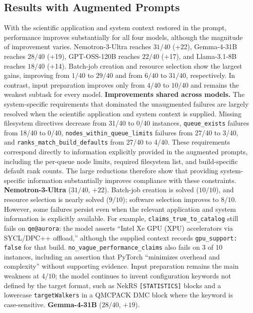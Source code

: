 \documentclass[conference]{IEEEtran}
\begin{document}
\subsection{Results with Augmented Prompts}
With the scientific application and system context restored in the prompt, performance improves substantially for all four models, although the magnitude of improvement varies. Nemotron-3-Ultra reaches $31/40$ (+22), Gemma-4-31B reaches $28/40$ (+19), GPT-OSS-120B reaches $22/40$ (+17), and Llama-3.1-8B reaches $18/40$ (+14). Batch-job creation and resource selection show the largest gains, improving from $1/40$ to $29/40$ and from $6/40$ to $31/40$, respectively. In contrast, input preparation improves only from $4/40$ to $10/40$ and remains the weakest subtask for every model.
\textbf{Improvements shared across models.}
The system-specific requirements that dominated the unaugmented failures are largely resolved when the scientific application and system context is supplied. Missing filesystem directives decrease from 31/40 to 0/40 instances, \texttt{queue\_exists} failures from 18/40 to 0/40, \texttt{nodes\_within\_queue\_limits} failures from 27/40 to 3/40, and \texttt{ranks\_match\_build\_defaults} from 27/40 to 4/40. These requirements correspond directly to information explicitly provided in the augmented prompts, including the per-queue node limits, required filesystem list, and build-specific default rank counts. The large reductions therefore show that providing system-specific information substantially improves compliance with these constraints.
\textbf{Nemotron-3-Ultra} ($31/40$, $+22$).
Batch-job creation is solved ($10/10$), and resource selection is nearly solved ($9/10$); software selection improves to $8/10$. However, some failures persist even when the relevant application and system information is explicitly available. For example, \texttt{claims\_true\_to\_catalog} still fails on \texttt{qe@aurora}: the model asserts ``Intel Xe GPU (XPU) accelerators via SYCL/DPC++ offload,'' although the supplied context records \texttt{gpu\_support: false} for that build. \texttt{no\_vague\_performance\_claims} also fails on 3 of 10 instances, including an assertion that PyTorch ``minimizes overhead and complexity'' without supporting evidence. Input preparation remains the main weakness at $4/10$; the model continues to invent configuration keywords not defined by the target format, such as NekRS \texttt{[STATISTICS]} blocks and a lowercase \texttt{targetWalkers} in a QMCPACK DMC block where the keyword is case-sensitive.
\textbf{Gemma-4-31B} ($28/40$, $+19$).
\end{document}
